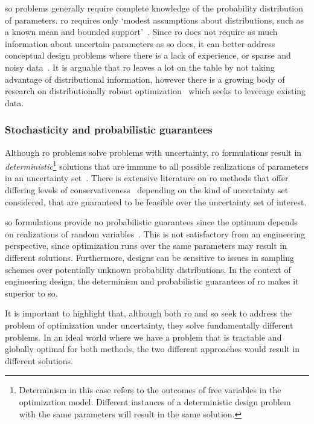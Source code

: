 \gls{so} problems generally require complete knowledge of the probability distribution of
parameters.
\gls{ro} requires only `modest assumptions  about distributions, such as a known mean and
bounded support'~\cite{Chen2007}. Since \gls{ro} does not require as much information
about uncertain parameters as \gls{so} does, it can better address conceptual design problems where there
is a lack of experience, or sparse and noisy data~\cite{Bertsimas2011}. It is arguable that \gls{ro}
leaves a lot on the table by not taking advantage of distributional information,
however there is a growing body of research on distributionally robust optimization~\cite{Bertsimas2018}
which seeks to leverage existing data.

\subsubsection{Stochasticity and probabilistic guarantees}

Although \gls{ro} problems solve problems with uncertainty,
\gls{ro} formulations result in \emph{deterministic}\footnote{Determinism in this case
refers to the outcomes of free variables in the optimization model.
Different instances of a deterministic design problem with
the same parameters will result in the same solution.} solutions that are immune
to all possible realizations of parameters in an uncertainty set~\cite{Bertsimas2011}.
There is extensive literature on \gls{ro} methods
that offer differing levels of conservativeness~\cite{Bertsimas2004}
depending on the kind of uncertainty set considered, that are guaranteed
to be feasible over the uncertainty set of interest.

\gls{so} formulations provide no probabilistic guarantees
since the optimum depends on realizations of random variables~\cite{Shmoys2004}.
This is not satisfactory from an engineering perspective, since
optimization runs over the same parameters may result in different
solutions. Furthermore, designs
can be sensitive to issues in sampling schemes over potentially unknown
probability distributions. In the context of engineering design, the determinism
and probabilistic guarantees of \gls{ro} makes
it superior to \gls{so}.

It is important to highlight that,
although both \gls{ro} and \gls{so} seek to address the problem
of optimization under uncertainty, they solve fundamentally different problems. In an ideal world where
we have a problem that is tractable and globally optimal for both methods, the two different
approaches would result in different solutions.

